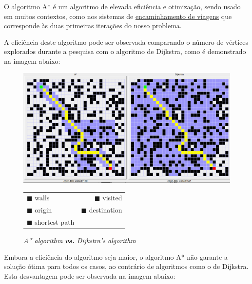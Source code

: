 \documentclass[article, a4paper, 12pt, oneside]{memoir}
\begin{document}
O algoritmo A* é um algoritmo de elevada eficiência e otimização, sendo usado em muitos contextos, como nos sistemas de \href{https://en.wikipedia.org/wiki/Journey_planner}{encaminhamento de viagens} que corresponde às duas primeiras iterações do nosso problema.

A eficiência deste algoritmo pode ser observada comparando o número de vértices explorados durante a pesquisa com o algoritmo de Dijkstra, como é demonstrado na imagem abaixo:

\begin{figure}[h]
\centering
\includegraphics[scale=0.4]{pathfinder}
\caption{\emph{A* algorithm \textbf{vs.} Dijkstra's algorithm}}
\begin{tabular}{ l r }
\color{black} $\blacksquare$ \color{black} walls & \color{Periwinkle} $\blacksquare$ \color{black} visited \\
\color{green} $\blacksquare$ \color{black} origin & \color{red} $\blacksquare$ \color{black} destination \\
\color{yellow} $\blacksquare$ \color{black} shortest path
\end{tabular}
\end{figure}

\newpage
Embora a eficiência do algoritmo seja maior, o algoritmo A* não garante a solução ótima para todos os casos, ao contrário de algoritmos como o de Dijkstra. Esta desvantagem pode ser observada na imagem abaixo:
\end{document}
